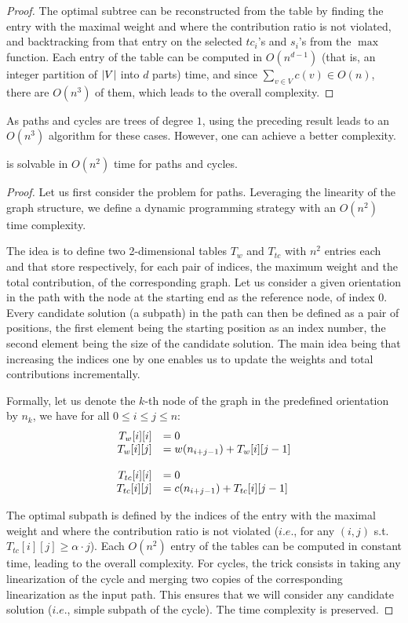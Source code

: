 \begin{proof}
			The optimal subtree can be reconstructed from the table by finding the entry with the maximal weight and where the contribution ratio is not violated, and backtracking from that entry on the selected $tc_i$'s and $s_i$'s from the $\max$ function.
			Each entry of the table can be computed in $O(n^{d-1})$ (that is, an integer partition of $\lvert V\rvert$ into $d$ parts) time, and since $\sum_{v\in V}c(v) \in O(n)$, there are $O(n^3)$ of them, which leads to the overall complexity.
		\end{proof}

		As paths and cycles are trees of degree $1$, using the preceding result leads to an $O(n^3)$ algorithm for these cases. However, one can achieve a better complexity.

		\begin{proposition}
		  \rbmwcs{} is solvable in $O(n^2)$ time for paths and cycles.
		\end{proposition}
		\begin{proof}
			Let us first consider the \rbmwcs{} problem for paths. Leveraging the linearity of the graph structure, we define a dynamic programming strategy with an $O(n^2)$ time complexity.

			The idea is to define two 2-dimensional tables $T_w$ and $T_{tc}$ with $n^2$ entries each and that store respectively, for each pair of indices, the maximum weight and the total contribution, of the corresponding graph. Let us consider a given orientation in the path with the node at the starting end as the reference node, of index 0. Every candidate solution (a subpath) in the path can then be defined as a pair of positions, the first element being the starting position as an index number, the second element being the size of the candidate solution. The main idea being that increasing the indices one by one enables us to update the weights and total contributions incrementally.

			Formally, let us denote the $k$-th node of the graph in the predefined orientation by $n_k$, we have for all $0 \leq i \leq j \leq n$: 
			\[
			  \begin{array}{rl}
				T_w[i][i]    &= 0 \\
				 T_w[i][j]    &= w(n_{i+j-1}) + T_w[i][j-1] \\
				 \vphantom{foobar} \\
				 T_{tc}[i][i] &= 0 \\
				 T_{tc}[i][j] &= c(n_{i+j-1}) + T_{tc}[i][j-1]
			  \end{array}
			\]

			The optimal subpath is defined by the indices of the entry with the maximal weight and where the contribution ratio is not violated ($i.e.$, for any $(i,j)$ s.t. $T_{tc}[i][j]\geq \alpha \cdot j$).
			Each $O(n^2)$ entry of the tables can be computed in constant time, leading to the overall complexity.
			For cycles, the trick consists in taking any linearization of the cycle and merging two copies of the corresponding linearization as the input path.
			This ensures that we will consider any candidate solution ($i.e.$, simple subpath of the cycle).
			The time complexity is preserved.
		\end{proof}


